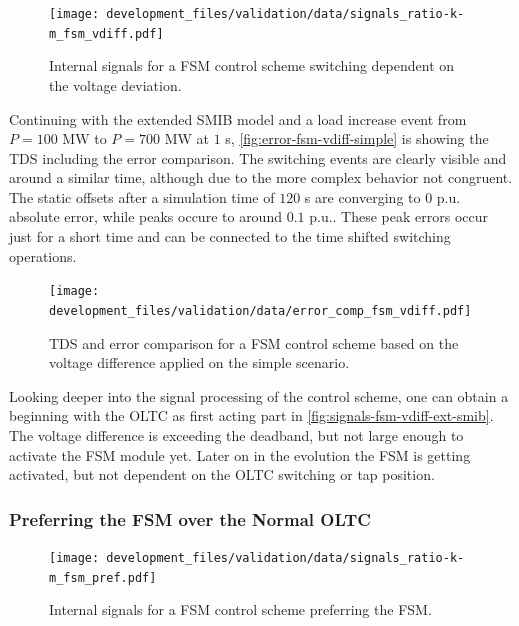 \begin{figure}[htbp!]
    \centering
    \texttt{[image: development\_files/validation/data/signals\_ratio-k-m\_fsm\_vdiff.pdf]}
    \caption[Internal signals for a \acs{FSM} control scheme switching dependent on the voltage deviation]{Internal signals for a \acs{FSM} control scheme switching dependent on the voltage deviation.}
    \label{fig:signals-fsm-vdiff-ext-smib}
\end{figure}

Continuing with the extended \acs{SMIB} model and a load increase event from $P=100\text{ MW}$ to $P=700\text{ MW}$ at $1$ s, \autoref{fig:error-fsm-vdiff-simple} is showing the \acs{TDS} including the error comparison.
The switching events are clearly visible and around a similar time, although due to the more complex behavior not congruent.
The static offsets after a simulation time of $120$ s are converging to $0$ p.u. absolute error, while peaks occure to around $0.1$ p.u..
These peak errors occur just for a short time and can be connected to the time shifted switching operations.

\begin{figure}[htbp!]
    \centering
    \texttt{[image: development\_files/validation/data/error\_comp\_fsm\_vdiff.pdf]}
    \caption[\acs{TDS} and error comparison for a \acs{FSM} control scheme based on the voltage difference applied on the simple scenario]{\acs{TDS} and error comparison for a \acs{FSM} control scheme based on the voltage difference applied on the simple scenario.}
    \label{fig:error-fsm-vdiff-simple}
\end{figure}

Looking deeper into the signal processing of the control scheme, one can obtain a beginning with the \acs{OLTC} as first acting part in \autoref{fig:signals-fsm-vdiff-ext-smib}.
The voltage difference is exceeding the deadband, but not large enough to activate the \acs{FSM} module yet.
Later on in the evolution the \acs{FSM} is getting activated, but not dependent on the \acs{OLTC} switching or tap position.

\subsubsection{Preferring the FSM over the Normal OLTC}

\begin{figure}[htbp!]
    \centering
    \texttt{[image: development\_files/validation/data/signals\_ratio-k-m\_fsm\_pref.pdf]}
    \caption[Internal signals for a \acs{FSM} control scheme preferring the \acs{FSM}]{Internal signals  for a \acs{FSM} control scheme preferring the \acs{FSM}.}
    \label{fig:signals-fsm-preferred}
\end{figure}

